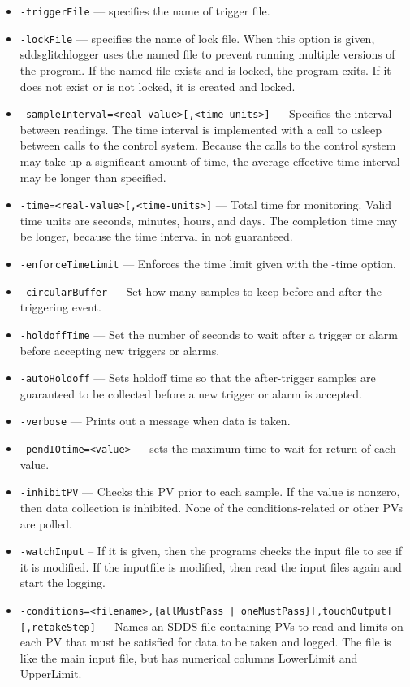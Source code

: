 \begin{itemize}
\begin{itemize}
        \item {\tt -triggerFile} --- specifies the name of trigger file.
        \item {\tt -lockFile} --- specifies the name of lock file. When this option is given,
                sddsglitchlogger uses the named file to prevent running multiple versions of
                the program.  If the named file exists and is locked, the program exits.  
                If it does not exist or is not locked, it is created and locked.
        \item {\tt -sampleInterval=<real-value>[,<time-units>]} --- Specifies the interval between readings.
                The time interval is implemented with a call to usleep between calls to the control system.
                Because the calls to the control system may take up a significant amount of time, the average
                effective time interval may be longer than specified.
        \item {\tt -time=<real-value>[,<time-units>]} --- Total time for monitoring. Valid time units are
                seconds, minutes, hours, and days. The completion time may be longer, because the time 
                interval in not guaranteed.
        \item {\tt -enforceTimeLimit} --- Enforces the time limit given with the -time option.
        \item {\tt -circularBuffer} --- Set how many samples to keep before and after the triggering event.
        \item {\tt -holdoffTime} --- Set the number of seconds to wait after a trigger or alarm before 
                accepting new triggers or alarms.
        \item {\tt -autoHoldoff} --- Sets holdoff time so that the after-trigger samples are guaranteed 
                to be collected before a new trigger or alarm is accepted.
        \item {\tt -verbose} --- Prints out a message when data is taken.
        \item {\tt -pendIOtime=<value>} --- sets the maximum time to wait for return of each value.
        \item {\tt -inhibitPV} --- Checks this PV prior to each sample.  If the value is nonzero, 
                then data collection is inhibited.  None of the conditions-related or other PVs are polled.
        \item {\tt -watchInput} -- If it is given, then the programs checks the input file to see if
                it is modified. If the inputfile is modified, then read the input files again and start
                the logging.
        \item {\verb+-conditions=<filename>,{allMustPass | oneMustPass}[,touchOutput][,retakeStep]+} --- 
                   Names an SDDS file containing PVs to read and limits on each PV that must
                   be satisfied for data to be taken and logged.  The file is like the main
                   input file, but has numerical columns LowerLimit and UpperLimit.


\end{itemize}
\end{itemize}

